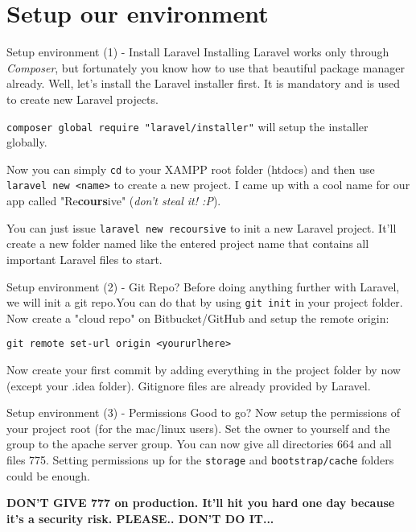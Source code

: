\section{Setup our environment}

\begin{frame}{Setup environment (1) - Install Laravel}
	Installing Laravel works only through \textit{Composer}, but fortunately you know how to use that beautiful package manager already.\pause
	Well, let's install the Laravel installer first. It is mandatory and is used to create new Laravel projects. \pause
	
	\texttt{composer global require "laravel/installer"} will setup the installer globally. \pause
	
	Now you can simply \texttt{cd} to your XAMPP root folder (htdocs) and then use \texttt{laravel new <name>} to create a new project. \pause
	I came up with a cool name for our app called "Re\textbf{cours}ive" (\textit{don't steal it! :P}). \pause
	
	You can just issue \texttt{laravel new recoursive} to init a new Laravel project. It'll create a new folder named like the entered project name that contains all important Laravel files to start.
\end{frame}

\begin{frame}{Setup environment (2) - Git Repo?}
	Before doing anything further with Laravel, we will init a git repo.\pause You can do that by using \texttt{git init} in your project folder. Now create a "cloud repo" on Bitbucket/GitHub and setup the remote origin:\pause
	
	\texttt{git remote set-url origin <yoururlhere>}
	
	\pause Now create your first commit by adding everything in the project folder by now (except your .idea folder). Gitignore files are already provided by Laravel. 
\end{frame}

\begin{frame}{Setup environment (3) - Permissions}
	Good to go? Now setup the permissions of your project root (for the mac/linux users). Set the owner to yourself and the group to the apache server group. You can now give all directories 664 and all files 775. Setting permissions up for the \texttt{storage} and \texttt{bootstrap/cache} folders could be enough. \pause
	
	\textbf{DON'T GIVE 777 on production. It'll hit you hard one day because it's a security risk. PLEASE.. DON'T DO IT...}
\end{frame}

